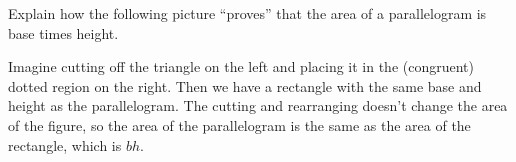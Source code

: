 \documentclass[nooutcomes]{ximera}
\begin{document}
\begin{problem}
Explain how the following picture ``proves'' that the area of a
  parallelogram is base times height.
\begin{image}
\end{image}
\begin{freeResponse}
\begin{hint}
Imagine cutting off the triangle on the left and placing it in the (congruent) dotted region on the right.  Then we have a rectangle with the same base and height as the parallelogram.  The cutting and rearranging doesn't change the area of the figure, so the area of the parallelogram is the same as the area of the rectangle, which is $bh$. 
\end{hint}
\end{freeResponse}
\end{problem}
\end{document}
